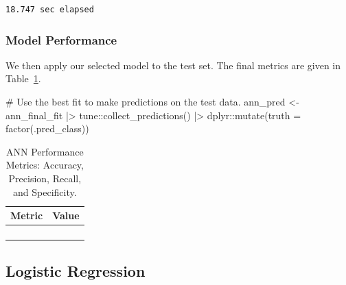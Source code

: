 \documentclass[
  letterpaper,
  DIV=11,
  numbers=noendperiod]{scrartcl}
\newenvironment{Shaded}{\begin{snugshade}}{\end{snugshade}}
\newcommand{\AttributeTok}[1]{\textcolor[rgb]{0.40,0.45,0.13}{#1}}
\newcommand{\CommentTok}[1]{\textcolor[rgb]{0.37,0.37,0.37}{#1}}
\newcommand{\FunctionTok}[1]{\textcolor[rgb]{0.28,0.35,0.67}{#1}}
\newcommand{\NormalTok}[1]{\textcolor[rgb]{0.00,0.23,0.31}{#1}}
\newcommand{\OtherTok}[1]{\textcolor[rgb]{0.00,0.23,0.31}{#1}}
\newcommand{\SpecialCharTok}[1]{\textcolor[rgb]{0.37,0.37,0.37}{#1}}
\begin{document}
\begin{verbatim}
18.747 sec elapsed
\end{verbatim}

\subsubsection{Model Performance}\label{model-performance-2}

We then apply our selected model to the test set. The final metrics are
given in Table~\ref{tbl-ann-performance}.

\begin{Shaded}
\begin{Highlighting}[]
\CommentTok{\# Use the best fit to make predictions on the test data.}
\NormalTok{ann\_pred }\OtherTok{\textless{}{-}} 
\NormalTok{  ann\_final\_fit }\SpecialCharTok{|\textgreater{}} 
\NormalTok{  tune}\SpecialCharTok{::}\FunctionTok{collect\_predictions}\NormalTok{() }\SpecialCharTok{|\textgreater{}}
\NormalTok{  dplyr}\SpecialCharTok{::}\FunctionTok{mutate}\NormalTok{(}\AttributeTok{truth =} \FunctionTok{factor}\NormalTok{(.pred\_class))}
\end{Highlighting}
\end{Shaded}

\begin{longtable}{>{\raggedright\arraybackslash}p{}>{\raggedleft\arraybackslash}p{}}

\caption{\label{tbl-ann-performance}ANN Performance Metrics: Accuracy,
Precision, Recall, and Specificity.}

\tabularnewline

\toprule
Metric & Value \\ 
\midrule\addlinespace[2.5pt]
\cellcolor[HTML]{FFFFFF}{Accuracy} & \cellcolor[HTML]{FFFFFF}{92.3} \\ 
\cellcolor[HTML]{FFFFFF}{Precision} & \cellcolor[HTML]{FFFFFF}{84.6} \\ 
\cellcolor[HTML]{FFFFFF}{Recall} & \cellcolor[HTML]{FFFFFF}{88.0} \\ 
\cellcolor[HTML]{FFFFFF}{Specificity} & \cellcolor[HTML]{FFFFFF}{93.9} \\ 
\bottomrule

\end{longtable}

\subsection{Logistic Regression}\label{logistic-regression}
\end{document}

